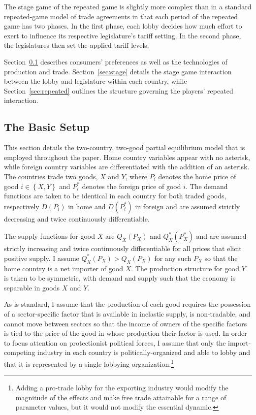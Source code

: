 \documentclass[authoryear, review]{elsarticle}
\begin{document}
The stage game of the repeated game is slightly more complex than in a standard repeated-game model of trade agreements in that each period of the repeated game has two phases. In the first phase, each lobby decides how much effort to exert to influence its respective legislature's tariff setting. In the second phase, the legislatures then set the applied tariff levels.

Section~\ref{sec:basic} describes consumers' preferences as well as the technologies of production and trade. Section~\ref{sec:stage} details the stage game interaction between the lobby and legislature within each country, while Section~\ref{sec:repeated} outlines the structure governing the players' repeated interaction.


\subsection{The Basic Setup}
\label{sec:basic}
This section details the two-country, two-good partial equilibrium model that is employed throughout the paper. Home country variables appear with no asterisk, while foreign country variables are differentiated with the addition of an asterisk. The countries trade two goods, $X$ and $Y$, where $P_i$ denotes the home price of good $i \in \left\{X,Y\right\}$ and $P_i^*$ denotes the foreign price of good $i$. The demand functions are taken to be identical in each country for both traded goods, respectively $D(P_i)$ in home and $D(P_i^*)$ in foreign and are assumed strictly decreasing and twice continuously differentiable.

The supply functions for good $X$ are $Q_X(P_X)$ and $Q_X^*(P_X^*)$ and are assumed strictly increasing and twice continuously differentiable for all prices that elicit positive supply. I assume $Q_X^*(P_X) > Q_X(P_X)$ for any such $P_X$ so that the home country is a net importer of good $X$. The production structure for good $Y$ is taken to be symmetric, with demand and supply such that the economy is separable in goods $X$ and $Y$.

As is standard, I assume that the production of each good requires the possession of a sector-specific factor that is available in inelastic supply, is non-tradable, and cannot move between sectors so that the income of owners of the specific factors is tied to the price of the good in whose production their factor is used. In order to focus attention on protectionist political forces, I assume that only the import-competing industry in each country is politically-organized and able to lobby and that it is represented by a single lobbying organization.\footnote{Adding a pro-trade lobby for the exporting industry would modify the magnitude of the effects and make free trade attainable for a range of parameter values, but it would not modify the essential dynamic.}
\end{document}
